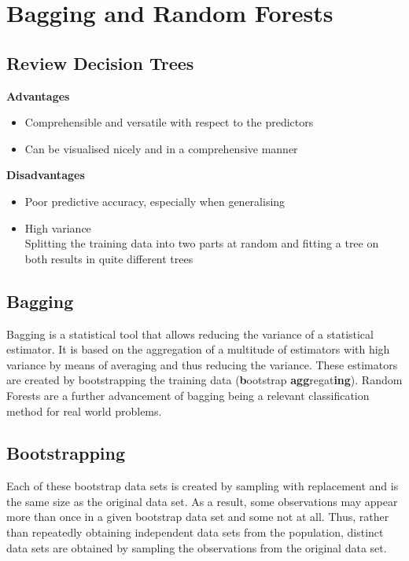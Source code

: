 \documentclass[11pt]{article}
\begin{document}
\section{Bagging and Random Forests}
\subsection{Review Decision Trees}
\textbf{Advantages}
\begin{itemize}
	\item Comprehensible and versatile with respect to the predictors
	\item Can be visualised nicely and in a comprehensive manner
\end{itemize}

\vspace{1em}
\noindent
\textbf{Disadvantages}
\begin{itemize}
	\item Poor predictive accuracy, especially when generalising
	\item High variance\\
	Splitting the training data into two parts at random and fitting a tree on both results in quite different trees
\end{itemize}

\subsection{Bagging}
Bagging is a statistical tool that allows reducing the variance of a statistical estimator. It is based on the aggregation of a multitude of estimators with high variance by means of averaging and thus reducing the variance. These estimators are created by bootstrapping the training data (\textbf{b}ootstrap \textbf{agg}regat\textbf{ing}). Random Forests are a further advancement of bagging being a relevant classification method for real world problems.

\subsection{Bootstrapping}
Each of these bootstrap data sets is created by sampling with replacement and is the same size as the original data set. As a result, some observations may appear more than once in a given bootstrap data set and some not at all. Thus, rather than repeatedly obtaining independent data sets from the population, distinct data sets are obtained by sampling the observations from the original data set.
\end{document}
